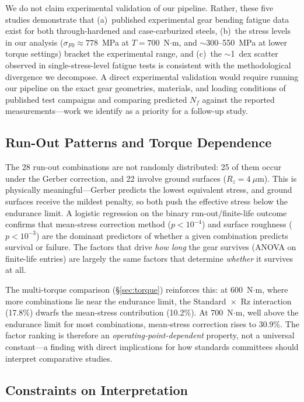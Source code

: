 \documentclass[12pt,a4paper]{article}
\begin{document}
We do not claim experimental validation of our pipeline. Rather, these
five studies demonstrate that (a)~published experimental gear bending
fatigue data exist for both through-hardened and case-carburized steels,
(b)~the stress levels in our analysis ($\sigma_{F0} \approx 778$~MPa
at $T{=}700$~N$\cdot$m, and $\sim$300--550~MPa at lower torque
settings) bracket the experimental range, and (c)~the $\sim$1~dex
scatter observed in single-stress-level fatigue tests is consistent
with the methodological divergence we decompose. A direct
experimental validation would require running our pipeline on the
exact gear geometries, materials, and loading conditions of published
test campaigns and comparing predicted $N_f$ against the reported
measurements---work we identify as a priority for a follow-up study.

\subsection{Run-Out Patterns and Torque Dependence}

The 28 run-out combinations are not randomly distributed: 25 of them
occur under the Gerber correction, and 22 involve ground surfaces
($R_z = 4~\mu$m). This is physically meaningful---Gerber predicts the
lowest equivalent stress, and ground surfaces receive the mildest
penalty, so both push the effective stress below the endurance limit.
A logistic regression on the binary run-out/finite-life outcome
confirms that mean-stress correction method ($p < 10^{-4}$) and
surface roughness ($p < 10^{-3}$) are the dominant predictors of
whether a given combination predicts survival or failure. The factors
that drive \emph{how long} the gear survives (ANOVA on finite-life
entries) are largely the same factors that determine \emph{whether} it
survives at all.

The multi-torque comparison (\S\ref{sec:torque}) reinforces this:
at 600~N$\cdot$m, where more combinations lie near the endurance
limit, the Standard~$\times$~Rz interaction (17.8\%) dwarfs the
mean-stress contribution (10.2\%). At 700~N$\cdot$m, well above the
endurance limit for most combinations, mean-stress correction rises to
30.9\%. The factor ranking is therefore an \emph{operating-point-dependent}
property, not a universal constant---a finding with direct implications
for how standards committees should interpret comparative studies.

\subsection{Constraints on Interpretation}
\end{document}
